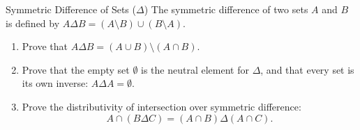 \begin{exercise}{Symmetric Difference of Sets ($\Delta$)}
The symmetric difference of two sets $A$ and $B$ is defined by $A \Delta B = (A \setminus B) \cup (B \setminus A)$.
\begin{enumerate}[leftmargin=1.5em,itemsep=2pt]
  \item Prove that $A \Delta B = (A \cup B) \setminus (A \cap B)$.
  \item Prove that the empty set $\emptyset$ is the neutral element for $\Delta$, and that every set is its own inverse: $A \Delta A = \emptyset$.
  \item Prove the distributivity of intersection over symmetric difference:
  \[
  A \cap (B \Delta C) = (A \cap B) \Delta (A \cap C).
  \]
\end{enumerate}
\end{exercise}

\begin{tabletworkspace}[5.0cm]
\end{tabletworkspace}


